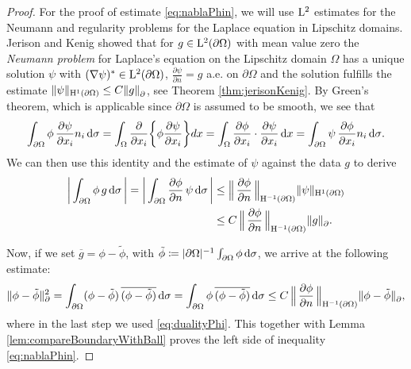 \begin{proof}
  For the proof of estimate \eqref{eq:nablaPhin}, we will use $\mathrm{L}^2$ estimates for the Neumann and regularity problems for the Laplace equation in Lipschitz domains.
  Jerison and Kenig showed that for $g \in \mathrm{L}^2(\partial\Omega)$ with mean value zero the \emph{Neumann problem} for Laplace's equation on the Lipschitz domain $\Omega$ has a unique solution $\psi$ with  $(\nabla \psi)^* \in \mathrm{L}^2(\partial\Omega)$, $\frac{\partial \psi}{\partial n} = g$ a.e. on $\partial \Omega$ and the solution fulfills the estimate $\|\psi\|_{\mathrm{H}^1(\partial\Omega)} \leq C \|g\|^{}_\partial$, see Theorem \ref{thm:jerisonKenig}.
  By Green's theorem, which is applicable since $\partial\Omega$ is assumed to be smooth, we see that
  \begin{align*}
    \int_{\partial\Omega} \phi \, \frac{\partial\psi}{\partial x_i} n_i \, {\operatorname{d}\!{\sigma}}  
    = \int_\Omega \frac{\partial}{\partial x_i} \bigg\{ \phi \frac{\partial\psi}{\partial x_i} \bigg\} d x 
    = \int_\Omega \frac{\partial \phi}{\partial x_i} \cdot \frac{\partial \psi}{\partial x_i} \, {\operatorname{d}\!{x}} 
    = \int_{\partial\Omega} \psi \, \frac{\partial \phi}{\partial x_i} n_i \, {\operatorname{d}\!{\sigma}}.
  \end{align*}
  We can then use this identity and the estimate of $\psi$ against the data $g$ to derive
  \begin{align}
    \label{eq:dualityPhi}
    \bigg| \int_{\partial\Omega} \phi \, g \, {\operatorname{d}\!{\sigma}}\, \bigg|
    =\bigg| \int_{\partial\Omega} \frac{\partial \phi}{\partial n} \, \psi \, {\operatorname{d}\!{\sigma}}\, \bigg|
    &\leq \Big\|\, \frac{\partial \phi}{\partial n}\, \Big\|_{\mathrm{H}^{-1}(\partial\Omega)} \| \psi \|_{\mathrm{H}^1(\partial\Omega)}  \nonumber \\
    &\leq C\, \Big\|\, \frac{\partial \phi}{\partial n} \,\Big\|_{\mathrm{H}^{-1}(\partial\Omega)} \| g\|^{}_\partial.
  \end{align}
  
  Now, if we set $\overline g = \phi - \tilde \phi$, with $\tilde \phi \coloneqq |\partial \Omega|^{-1} \int_{\partial\Omega} \phi \, {\operatorname{d}\!{\sigma}}$, we arrive at the following estimate:
  \begin{align*}
      \| \phi - \tilde\phi \|_\partial^2
    = \int_{\partial\Omega} (\phi - \tilde \phi) \, \overline{(\phi - \tilde\phi)} \, {\operatorname{d}\!{\sigma}} 
    = \int_{\partial\Omega} \phi\, \overline{(\phi - \tilde\phi)} \, {\operatorname{d}\!{\sigma}} 
    \leq C\, \Big\|\, \frac{\partial\phi}{\partial n}\, \Big\|_{\mathrm{H}^{-1}(\partial\Omega)} \|\phi - \tilde \phi\|^{}_\partial,
  \end{align*}
  where in the last step we used \eqref{eq:dualityPhi}.
  This together with Lemma \ref{lem:compareBoundaryWithBall} proves the left side of inequality \eqref{eq:nablaPhin}.


\end{proof}
